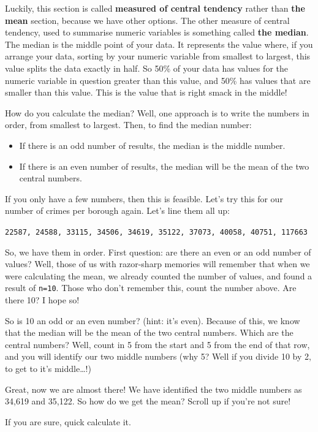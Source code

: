 \documentclass[
]{book}
\providecommand{\tightlist}{%
  \setlength{\itemsep}{0pt}\setlength{\parskip}{0pt}}
\begin{document}
Luckily, this section is called \textbf{measured of central tendency} rather than \textbf{the mean} section, because we have other options. The other measure of central tendency, used to summarise numeric variables is something called \textbf{the median}. The median is the middle point of your data. It represents the value where, if you arrange your data, sorting by your numeric variable from smallest to largest, this value splits the data exactly in half. So 50\% of your data has values for the numeric variable in question greater than this value, and 50\% has values that are smaller than this value. This is the value that is right smack in the middle!

How do you calculate the median? Well, one approach is to write the numbers in order, from smallest to largest. Then, to find the median number:

\begin{itemize}
\tightlist
\item
  If there is an odd number of results, the median is the middle number.
\item
  If there is an even number of results, the median will be the mean of the two central numbers.
\end{itemize}

If you only have a few numbers, then this is feasible. Let's try this for our number of crimes per borough again. Let's line them all up:

\texttt{22587,\ 24588,\ 33115,\ 34506,\ 34619,\ 35122,\ 37073,\ 40058,\ 40751,\ 117663}

So, we have them in order. First question: are there an even or an odd number of values? Well, those of us with razor-sharp memories will remember that when we were calculating the mean, we already counted the number of values, and found a result of \texttt{n=10}. Those who don't remember this, count the number above. Are there 10? I hope so!

So is 10 an odd or an even number? (hint: it's even). Because of this, we know that the median will be the mean of the two central numbers. Which are the central numbers? Well, count in 5 from the start and 5 from the end of that row, and you will identify our two middle numbers (why 5? Well if you divide 10 by 2, to get to it's middle\ldots!)

Great, now we are almost there! We have identified the two middle numbers as 34,619 and 35,122. So how do we get the mean? Scroll up if you're not sure!

If you are sure, quick calculate it.
\end{document}
